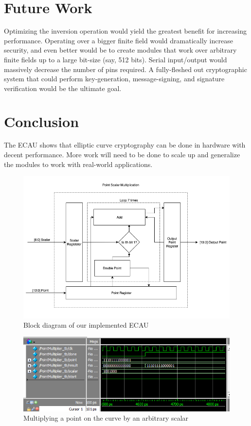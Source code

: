 \documentclass{IEEEtran}
\begin{document}
\section{Future Work}
Optimizing the inversion operation would yield the greatest benefit for increasing performance. Operating over a bigger finite field would dramatically increase security, and even better would be to create modules that work over arbitrary finite fields up to a large bit-size (say, 512 bits). Serial input/output would massively decrease the number of pins required. A fully-fleshed out cryptographic system that could perform key-generation, message-signing, and signature verification would be the ultimate goal.

\section{Conclusion}
The ECAU shows that elliptic curve cryptography can be done in hardware with decent performance. More work will need to be done to scale up and generalize the modules to work with real-world applications. 




\begin{figure}[h]
\centering
\captionsetup{justification=centering}
\includegraphics[scale=0.6]{images/blockdiagram.png}
\caption{Block diagram of our implemented ECAU}
\label{block}
\end{figure}

\begin{figure}[h]
\centering
\captionsetup{justification=centering}
\includegraphics[scale=0.75]{images/simulation.png}
\caption{Multiplying a point on the curve by an arbitrary scalar}
\label{sim}
\end{figure}
\end{document}

